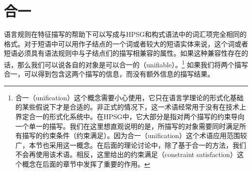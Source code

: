 \section{合一}
\label{sec-unification}

\mbox{}%
语言规则在特征描写的帮助下可以写成与HPSG和构式语法中的词汇项完全相同的格式。对于短语中可以用作子结点的一个词或者较大的短语实体来说，这个词或者短语必须具有语法规则中与子结点们的描写相兼容的属性。如果这种兼容性存在的话，那么我们可以说各自的对象是可以合一的（unifiable）。\footnote{%
  合一（unification）这个概念需要小心使用，它只在语言学理论的形式化基础的某些假说下才是合适的。非正式的情况下，这一术语经常用于没有在技术上界定合一的形式化系统中。在HPSG中，它大部分是指对两个描写的约束导向一个单一的描写。我们在这里想直观说明的是，所描写的对象需要同时满足所有描写的约束条件（约束满足）。因为合一（unification）这个术语应用范围较广，本节也采用这一概念。在后面的理论讨论中，除了基于合一的方法，我们不会再使用该术语。相反，这里给出的约束满足（constraint satisfaction）这个概念在后面的章节中发挥了重要的作用。
}
如果我们将两个描写合一，可以得到包含这两个描写的信息，而没有额外信息的描写结果。

